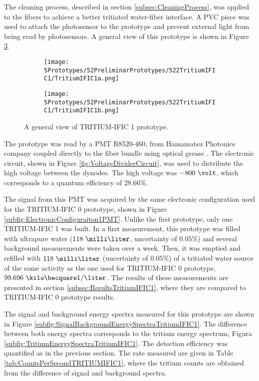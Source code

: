 The cleaning process, described in section \ref{subsec:CleaningProcess}, was applied to the fibers to achieve a better tritiated water-fiber interface. A PVC piece was used to attach the photosensor to the prototype and prevent external light from being read by photosensors. A general view of this prototype is shown in Figure \ref{fig:TritumIFIC1}.

\begin{figure}
\centering
    \begin{subfigure}[b]{0.40\textwidth}
    \centering
    \texttt{[image: 5Prototypes/52PreliminarPrototypes/522TritiumIFIC1/TritiumIFIC1a.png]}  
    \caption{\label{subfig:TritumIFIC1a}}
    \end{subfigure}
    \hfill
    \begin{subfigure}[b]{0.40\textwidth}
    \centering
    \texttt{[image: 5Prototypes/52PreliminarPrototypes/522TritiumIFIC1/TritiumIFIC1b.png]}  
    \caption{\label{subfig:TritumIFIC1b}}
    \end{subfigure}
 \caption{A general view of TRITIUM-IFIC 1 prototype.}
 \label{fig:TritumIFIC1}
\end{figure}

The prototype was read by a PMT R8520-460, from Hamamatsu Photonics company \cite{DataSheetPMTs} coupled directly to the fiber bundle using optical grease \cite{OpticalGrease}. The electronic circuit, shown in Figure \ref{fig:VoltageDividerCircuit}, was used to distribute the high voltage between the dynodes. The high voltage was $-800~\volt$, which corresponds to a quantum efficiency of $28.66\%$.

The signal from this PMT was acquired by the same electronic configuration used for the TRITIUM-IFIC 0 prototype, shown in Figure \ref{subfig:ElectronicConfiguraiton1PMT}. Unlike the first prototype, only one TRITIUM-IFIC 1 was built. In a first measurement, this prototype was filled with ultrapure water ($118~\milli\liter$, uncertainty of $0.05\%$) and several background measurements were taken over a week. Then, it was emptied and refilled with $118~\milli\liter$ (uncertainty of $0.05\%$) of a tritiated water source of the same activity as the one used for TRITIUM-IFIC 0 prototype, $99.696~\kilo\becquerel/\liter$. The results of these measurements are presented in section \ref{subsec:ResultsTritiumIFIC1}, where they are compared to TRITIUM-IFIC 0 prototype results.

The signal and background energy spectra measured for this prototype are shown in Figure \ref{subfig:SignalBackgroundEnergySpectraTritiumIFIC1}. The difference between both energy spectra corresponds to the tritium energy spectrum, Figura \ref{subfig:TritiumEnergySpectraTritiumIFIC1}. The detection efficiency was quantified as in the previous section. The rate measured are given in Table \ref{tab:CountsPerSecondTRITIUMIFIC1}, where the tritium counts are obtained from the difference of signal and background spectra.

